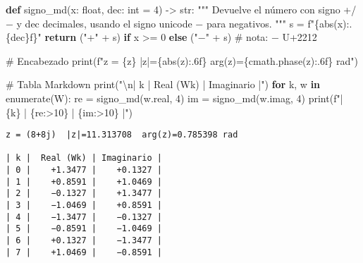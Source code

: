 \documentclass[
  letterpaper,
  DIV=11,
  numbers=noendperiod]{scrreprt}
\newenvironment{Shaded}{\begin{snugshade}}{\end{snugshade}}
\newcommand{\BuiltInTok}[1]{\textcolor[rgb]{0.00,0.23,0.31}{#1}}
\newcommand{\CharTok}[1]{\textcolor[rgb]{0.13,0.47,0.30}{#1}}
\newcommand{\CommentTok}[1]{\textcolor[rgb]{0.37,0.37,0.37}{#1}}
\newcommand{\ControlFlowTok}[1]{\textcolor[rgb]{0.00,0.23,0.31}{\textbf{#1}}}
\newcommand{\DecValTok}[1]{\textcolor[rgb]{0.68,0.00,0.00}{#1}}
\newcommand{\KeywordTok}[1]{\textcolor[rgb]{0.00,0.23,0.31}{\textbf{#1}}}
\newcommand{\NormalTok}[1]{\textcolor[rgb]{0.00,0.23,0.31}{#1}}
\newcommand{\OperatorTok}[1]{\textcolor[rgb]{0.37,0.37,0.37}{#1}}
\newcommand{\SpecialCharTok}[1]{\textcolor[rgb]{0.37,0.37,0.37}{#1}}
\newcommand{\SpecialStringTok}[1]{\textcolor[rgb]{0.13,0.47,0.30}{#1}}
\newcommand{\StringTok}[1]{\textcolor[rgb]{0.13,0.47,0.30}{#1}}
\begin{document}
\begin{Shaded}
\begin{Highlighting}[]
\KeywordTok{def}\NormalTok{ signo\_md(x: }\BuiltInTok{float}\NormalTok{, dec: }\BuiltInTok{int} \OperatorTok{=} \DecValTok{4}\NormalTok{) }\OperatorTok{{-}\textgreater{}} \BuiltInTok{str}\NormalTok{:}
    \CommentTok{"""}
\CommentTok{    Devuelve el número con signo +/− y \textquotesingle{}dec\textquotesingle{} decimales, usando el}
\CommentTok{    signo unicode \textquotesingle{}−\textquotesingle{} para negativos.}
\CommentTok{    """}
\NormalTok{    s }\OperatorTok{=} \SpecialStringTok{f"}\SpecialCharTok{\{}\BuiltInTok{abs}\NormalTok{(x)}\SpecialCharTok{:.}\NormalTok{\{dec\}f}\SpecialCharTok{\}}\SpecialStringTok{"}
    \ControlFlowTok{return}\NormalTok{ (}\StringTok{"+"} \OperatorTok{+}\NormalTok{ s) }\ControlFlowTok{if}\NormalTok{ x }\OperatorTok{\textgreater{}=} \DecValTok{0} \ControlFlowTok{else}\NormalTok{ (}\StringTok{"−"} \OperatorTok{+}\NormalTok{ s)  }\CommentTok{\# nota: \textquotesingle{}−\textquotesingle{} U+2212}

\CommentTok{\# Encabezado}
\BuiltInTok{print}\NormalTok{(}\SpecialStringTok{f"z = }\SpecialCharTok{\{}\NormalTok{z}\SpecialCharTok{\}}\SpecialStringTok{  |z|=}\SpecialCharTok{\{}\BuiltInTok{abs}\NormalTok{(z)}\SpecialCharTok{:.6f\}}\SpecialStringTok{  arg(z)=}\SpecialCharTok{\{}\NormalTok{cmath}\SpecialCharTok{.}\NormalTok{phase(z)}\SpecialCharTok{:.6f\}}\SpecialStringTok{ rad"}\NormalTok{)}

\CommentTok{\# Tabla Markdown}
\BuiltInTok{print}\NormalTok{(}\StringTok{"}\CharTok{\textbackslash{}n}\StringTok{| k |  Real (Wk) | Imaginario |"}\NormalTok{)}
\ControlFlowTok{for}\NormalTok{ k, w }\KeywordTok{in} \BuiltInTok{enumerate}\NormalTok{(W):}
\NormalTok{    re }\OperatorTok{=}\NormalTok{ signo\_md(w.real, }\DecValTok{4}\NormalTok{)}
\NormalTok{    im }\OperatorTok{=}\NormalTok{ signo\_md(w.imag, }\DecValTok{4}\NormalTok{)}
    \BuiltInTok{print}\NormalTok{(}\SpecialStringTok{f"| }\SpecialCharTok{\{}\NormalTok{k}\SpecialCharTok{\}}\SpecialStringTok{ | }\SpecialCharTok{\{}\NormalTok{re}\SpecialCharTok{:\textgreater{}10\}}\SpecialStringTok{ | }\SpecialCharTok{\{}\NormalTok{im}\SpecialCharTok{:\textgreater{}10\}}\SpecialStringTok{ |"}\NormalTok{)}
\end{Highlighting}
\end{Shaded}

\begin{verbatim}
z = (8+8j)  |z|=11.313708  arg(z)=0.785398 rad

| k |  Real (Wk) | Imaginario |
| 0 |    +1.3477 |    +0.1327 |
| 1 |    +0.8591 |    +1.0469 |
| 2 |    −0.1327 |    +1.3477 |
| 3 |    −1.0469 |    +0.8591 |
| 4 |    −1.3477 |    −0.1327 |
| 5 |    −0.8591 |    −1.0469 |
| 6 |    +0.1327 |    −1.3477 |
| 7 |    +1.0469 |    −0.8591 |
\end{verbatim}
\end{document}
